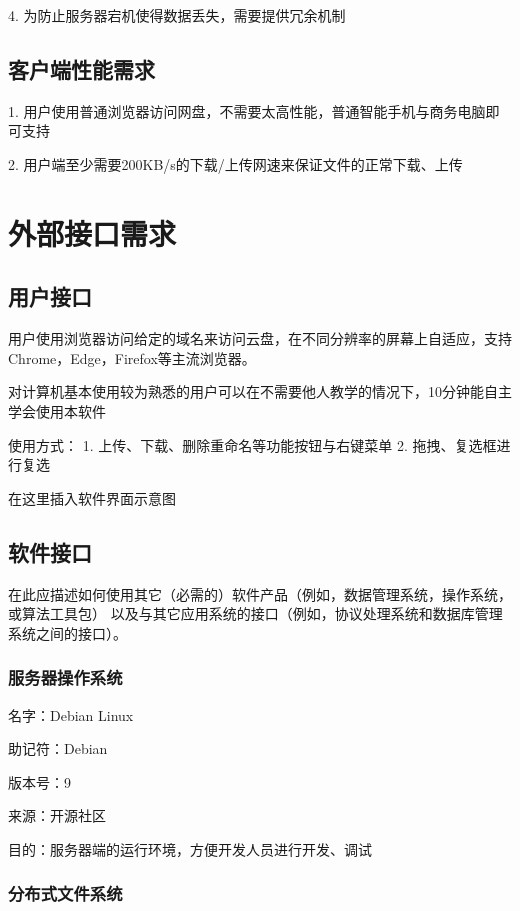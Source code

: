 4. 为防止服务器宕机使得数据丢失，需要提供冗余机制

\subsection{客户端性能需求}

1. 用户使用普通浏览器访问网盘，不需要太高性能，普通智能手机与商务电脑即可支持

2. 用户端至少需要200KB/s的下载/上传网速来保证文件的正常下载、上传

\section{外部接口需求}
\subsection{用户接口}

用户使用浏览器访问给定的域名来访问云盘，在不同分辨率的屏幕上自适应，支持Chrome，Edge，Firefox等主流浏览器。

对计算机基本使用较为熟悉的用户可以在不需要他人教学的情况下，10分钟能自主学会使用本软件

使用方式：
1. 上传、下载、删除重命名等功能按钮与右键菜单
2. 拖拽、复选框进行复选

在这里插入软件界面示意图

\subsection{软件接口}

在此应描述如何使用其它（必需的）软件产品（例如，数据管理系统，操作系统，或算法工具包）
以及与其它应用系统的接口（例如，协议处理系统和数据库管理系统之间的接口）。

\subsubsection{服务器操作系统}

名字：Debian Linux

助记符：Debian

版本号：9

来源：开源社区

目的：服务器端的运行环境，方便开发人员进行开发、调试

\subsubsection{分布式文件系统}

